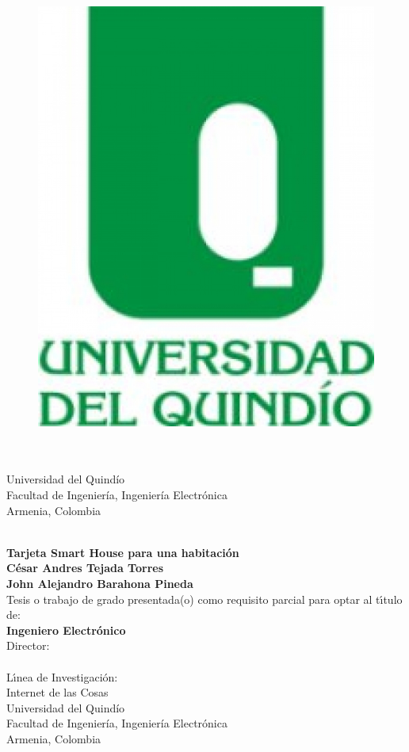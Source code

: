 \begin{center}
	\begin{figure}
		\centering
		\includegraphics[width=0.2\linewidth]{Imagenes/escudo}
	\end{figure}
\thispagestyle{empty} \vspace*{2.0cm} \textbf{\huge
\tituloTesis}\\[5.0cm]
\Large\textbf{\autorTesis}\\[4.7cm] %
\small Universidad del Quindío\\
Facultad de Ingeniería, Ingeniería Electrónica\\
Armenia, Colombia\\
\anioTesis\\
\end{center}

\newpage{\pagestyle{empty}\cleardoublepage}


\newpage
\begin{center}
\thispagestyle{empty} \vspace*{0cm} \textbf{\huge
Tarjeta Smart House para una habitación}\\[3.0cm]
\Large\textbf{César Andres Tejada Torres\\John Alejandro Barahona Pineda}\\[3.0cm]
\small Tesis o trabajo de grado presentada(o) como requisito parcial para optar al
t\'{\i}tulo de:\\
\textbf{Ingeniero Electrónico}\\[2.1cm] %
Director:\\
\directorTesis\\[2.0cm]
L\'{\i}nea de Investigaci\'{o}n:\\
Internet de las Cosas\\
Universidad del Quindío\\
Facultad de Ingeniería, Ingeniería Electrónica\\
Armenia, Colombia\\
\anioTesis\\
\end{center}

\newpage
\thispagestyle{empty} \textbf{}\normalsize
\\\\\\%

